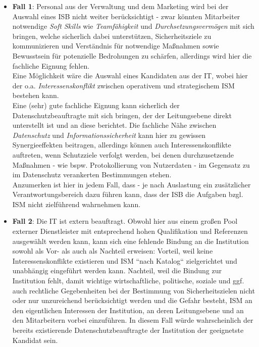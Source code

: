\begin{itemize}
    \itemsep0.5em
    \item \textbf{Fall 1}: Personal aus der Verwaltung und dem Marketing wird bei der Auswahl eines ISB nicht weiter berücksichtigt - zwar könnten Mitarbeiter notwendige \textit{Soft Skills} wie \textit{Teamfähigkeit} und \textit{Durchsetzungsvermögen} mit sich bringen, welche sicherlich dabei unterstützen, Sicherheitsziele zu kommunizieren und Verständnis für notwendige Maßnahmen sowie Bewusstsein für potenzielle Bedrohungen zu schärfen, allerdings wird hier die fachliche Eignung fehlen.\\
    Eine Möglichkeit wäre die Auswahl eines Kandidaten aus der IT, wobei hier der o.a. \textit{Interessenskonflikt} zwischen operativem und strategischem ISM bestehen kann.\\
     Eine (sehr) gute fachliche Eignung kann sicherlich der Datenschutzbeauftragte mit sich bringen, der der Leitungsebene direkt unterstellt ist und an diese berichtet.
     Die fachliche Nähe zwischen \textit{Datenschutz} und \textit{Informationssicherheit} kann hier zu gewissen Synergieeffekten beitragen, allerdings können auch Interessenskonflikte auftreten, wenn Schutzziele verfolgt werden, bei denen durchzusetzende Maßnahmen - wie bspw. Protokollierung von Nutzerdaten - im Gegensatz zu im Datenschutz verankerten Bestimmungen stehen.\\
     Anzumerken ist hier in jedem Fall, dass - je nach Auslastung  ein zusätzlicher Verantwortungsbereich dazu führen kann, dass der ISB die Aufgaben bzgl. ISM nicht zielführend wahrnehmen kann.
    \item \textbf{Fall 2}: Die IT ist extern beauftragt.
    Obwohl hier aus einem großen Pool externer Dienstleister mit entsprechend hohen Qualifikation und Referenzen ausgewählt werden kann, kann sich eine fehlende Bindung an die Institution sowohl als Vor- als auch als Nachteil erweisen: Vorteil, weil keine Interessenskonflikte existieren und ISM ``nach Katalog`` zielgerichtet und unabhängig eingeführt werden kann.
    Nachteil, weil die Bindung zur Institution fehlt, damit wichtige wirtschaftliche, politische, soziale und ggf. auch rechtliche Gegebenheiten bei der Bestimmung von Sicherheitszielen nicht oder nur unzureichend berücksichtigt werden und die Gefahr besteht, ISM an den eigentlichen Interessen der Institution, an deren Leitungsebene und an den Mitarbeitern vorbei einzuführen.
    In diesem Fall würde wahrscheinlich der bereits existierende Datenschutzbeauftragte der Institution der geeignetste Kandidat sein.
\end{itemize}